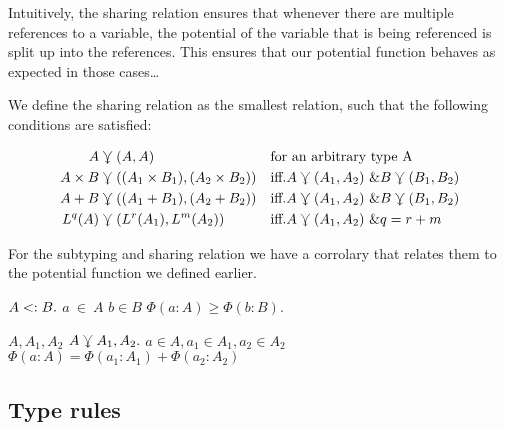 Intuitively, the sharing relation ensures that whenever there are multiple references to a variable, the potential of the variable that is being referenced is split up into the references. This ensures that our potential function behaves as expected in those cases\dots

We define the sharing relation as the smallest relation, such that the following conditions are satisfied:

\begin{align*}
   A & \curlyveedownarrow (A, A) && \text{for an arbitrary type A} \\
   A \times B & \curlyveedownarrow ((A_1 \times B_1), (A_2 \times B_2)) && \text{iff.} A \curlyveedownarrow (A_1, A_2) ~ \& B \curlyveedownarrow (B_1, B_2) \\
   A + B & \curlyveedownarrow ((A_1 + B_1), (A_2 + B_2)) && \text{iff.} A \curlyveedownarrow (A_1, A_2) ~ \& B \curlyveedownarrow (B_1, B_2) \\
   L^q(A) & \curlyveedownarrow (L^r(A_1), L^m(A_2)) && \text{iff.} A \curlyveedownarrow (A_1, A_2) ~ \& q = r + m \\
\end{align*}

For the subtyping and sharing relation we have a corrolary that relates them to the potential function we defined earlier.

\begin{lemma}
   $A <: B.$ $a~\in~A$  $b \in B$  $\Phi(a: A) \geq \Phi(b : B).$
\end{lemma}
\begin{lemma}
    $A, A_1, A_2$ $A \curlyveedownarrow A_1, A_2.$  $a \in A, a_1 \in A_1, a_2 \in A_2$  $\Phi(a: A) = \Phi(a_1: A_1) + \Phi(a_2 : A_2)$ 
\end{lemma}




\subsection{Type rules}
\label{sec:type-rules}
